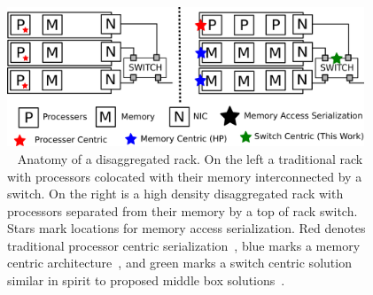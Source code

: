 \begin{figure}
      \centering
      \includegraphics[width=0.95\textwidth]{fig/overview.png}
      \caption{~
      Anatomy of a disaggregated rack. On the left a
      traditional rack with processors colocated with their memory
      interconnected by a switch. On the right is a high density
      disaggregated rack with processors separated from their memory
      by a top of rack switch. Stars mark locations for memory access
      serialization. Red denotes traditional processor centric
      serialization~\cite{memc3, cell, sonuma, storm, clover}, blue marks a
      memory centric architecture~\cite{aguilera2019designing}, and
      green marks a switch centric solution similar in spirit to
      proposed middle box solutions~\cite{254120}.
      \label{fig:overview}
      }
\end{figure}






